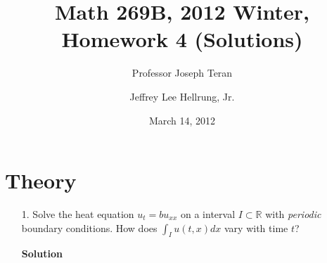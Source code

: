 \documentclass{article}
\begin{document}
\title{Math 269B, 2012 Winter, Homework 4 (Solutions)}
\date{March 14, 2012}
\author{Professor Joseph Teran \and Jeffrey Lee Hellrung, Jr.}
\maketitle

\section{Theory}

\begin{itemize}

\item[1.] Solve the heat equation $u_t = b u_{xx}$ on a interval $I \subset \mathbb{R}$ with \emph{periodic} boundary conditions. How does $\int_I u(t,x) dx$ vary with time $t$?

\textbf{Solution}


\end{itemize}
\end{document}
